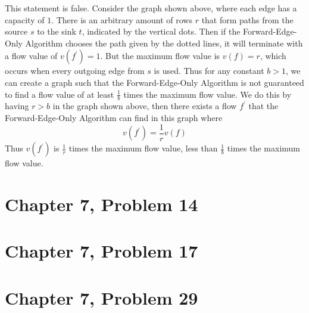 \documentclass[12pt]{article}
\begin{document}
This statement is false. Consider the graph shown above, where each edge has a capacity of \(1\). There is an arbitrary amount
of rows \(r\) that form paths from the source \(s\) to the sink \(t\), indicated by the vertical dots. Then if the Forward-Edge-Only Algorithm
chooses the path given by the dotted lines, it will terminate with a flow value of \(v(f^\prime)=1\). But
the maximum flow value is \(v(f)=r\), which occurs when every outgoing edge from \(s\) is used. Thus for any constant \(b>1\), we can
create a graph such that the Forward-Edge-Only Algorithm is not guaranteed to find a flow value of at least \(\frac{1}{b}\) times the maximum flow value.
We do this by having \(r>b\) in the graph shown above, then there exists a flow \(f^\prime\) that the Forward-Edge-Only Algorithm can find in this graph where
\[v(f^\prime)=\frac{1}{r}v(f)\]
Thus \(v(f^\prime)\) is \(\frac{1}{r}\) times the maximum flow value, less than \(\frac{1}{b}\) times the maximum flow value.

\pagebreak

\section*{Chapter 7, Problem 14}

\pagebreak

\section*{Chapter 7, Problem 17}

\pagebreak

\section*{Chapter 7, Problem 29}
\end{document}
